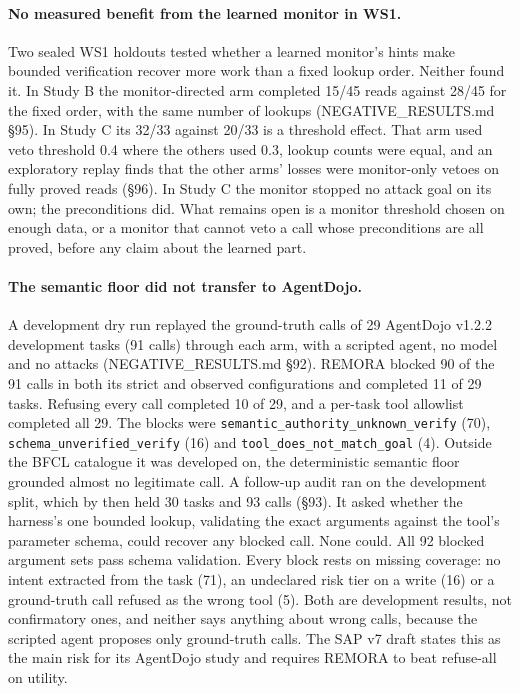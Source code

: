 \documentclass[10pt,twocolumn]{article}
\begin{document}
\paragraph{No measured benefit from the learned monitor in WS1.}
Two sealed WS1 holdouts tested whether a learned monitor's hints make
bounded verification recover more work than a fixed lookup order.
Neither found it. In Study B the monitor-directed arm completed 15/45
reads against 28/45 for the fixed order, with the same number of lookups
(NEGATIVE\_RESULTS.md \S95). In Study C its 32/33 against 20/33 is a
threshold effect. That arm used veto threshold 0.4 where the others used
0.3, lookup counts were equal, and an exploratory replay finds that the
other arms' losses were monitor-only vetoes on fully proved reads (\S96).
In Study C the monitor stopped no attack goal on its own; the
preconditions did. What remains open is a monitor threshold chosen on
enough data, or a monitor that cannot veto a call whose preconditions are
all proved, before any claim about the learned part.

\paragraph{The semantic floor did not transfer to AgentDojo.}
A development dry run replayed the ground-truth calls of 29 AgentDojo
v1.2.2 development tasks (91 calls) through each arm, with a scripted agent,
no model and no attacks (NEGATIVE\_RESULTS.md \S92). REMORA blocked 90 of
the 91 calls in both its strict and observed configurations and completed
11 of 29 tasks. Refusing every call completed 10 of 29, and a per-task tool
allowlist completed all 29. The blocks were
\texttt{semantic\_authority\_unknown\_verify} (70),
\texttt{schema\_unverified\_verify} (16) and
\texttt{tool\_does\_not\_match\_goal} (4). Outside the BFCL catalogue it was
developed on, the deterministic semantic floor grounded almost no legitimate
call. A follow-up audit ran on the development split, which by then held 30
tasks and 93 calls (\S93). It asked whether the harness's one bounded
lookup, validating the exact arguments against the tool's parameter schema,
could recover any blocked call. None could. All 92 blocked argument sets
pass schema validation. Every block rests on missing coverage: no
intent extracted from the task (71), an undeclared risk tier on a write (16)
or a ground-truth call refused as the wrong tool (5). Both are development
results, not confirmatory ones, and neither says anything about wrong calls,
because the scripted agent proposes only ground-truth calls. The SAP v7
draft states this as the main risk for its AgentDojo study and requires
REMORA to beat refuse-all on utility.
\end{document}
